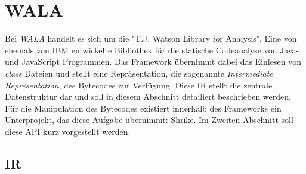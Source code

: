 \section{WALA}

Bei \textit{WALA} handelt es sich um die "T.J. Watson Library for Analysis". Eine von ehemals von IBM 
entwickelte Bibliothek für die statische Codeanalyse von Java- und JavaScript Programmen. Das Framework 
übernimmt dabei das Einlesen von \textit{class} Dateien und stellt eine Repräsentation, die sogenannte 
\textit{Intermediate Representation}, des Bytecodes zur Verfügung. Diese IR stellt die zentrale 
Datenstruktur dar und soll in diesem Abschnitt detailiert beschrieben werden.
\\
Für die Manipulation des Bytecodes existiert innerhalb des Frameworks ein Unterprojekt, das diese Aufgabe 
übernimmt: Shrike. Im Zweiten Abschnitt soll diese API kurz vorgestellt werden.  

\subsection{IR}

